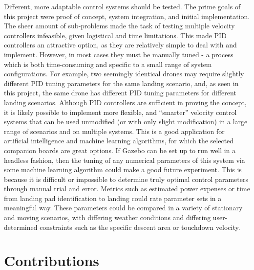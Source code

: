 Different, more adaptable control systems should be tested. The prime goals of this project were proof of concept, system integration, and initial implementation. The sheer amount of sub-problems made the task of testing multiple velocity controllers infeasible, given logistical and time limitations. This made PID controllers an attractive option, as they are relatively simple to deal with and implement. However, in most cases they must be manually tuned - a process which is both time-consuming and specific to a small range of system configurations. For example, two seemingly identical drones may require slightly different PID tuning parameters for the same landing scenario, and, as seen in this project, the same drone has different PID tuning parameters for different landing scenarios. Although PID controllers are sufficient in proving the concept, it is likely possible to implement more flexible, and ``smarter'' velocity control systems that can be used unmodified (or with only slight modification) in a large range of scenarios and on multiple systems. This is a good application for artificial intelligence and machine learning algorithms, for which the selected companion boards are great options. If Gazebo can be set up to run well in a headless fashion, then the tuning of any numerical parameters of this system via some machine learning algorithm could make a good future experiment. This is because it is difficult or impossible to determine truly optimal control parameters through manual trial and error. Metrics such as estimated power expenses or time from landing pad identification to landing could rate parameter sets in a meaningful way. These parameters could be compared in a variety of stationary and moving scenarios, with differing weather conditions and differing user-determined constraints such as the specific descent area or touchdown velocity.

\section{Contributions}

